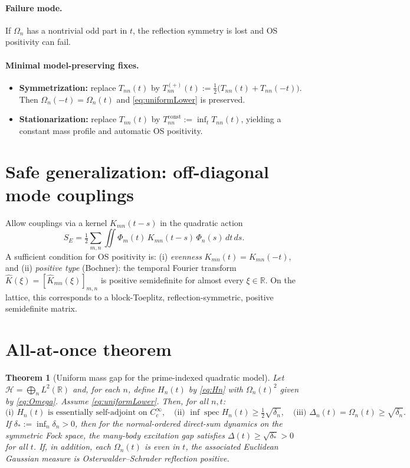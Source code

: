 \documentclass[11pt]{article}
\theoremstyle{plain}
\newtheorem{theorem}{Theorem}[section]
\theoremstyle{definition}
\theoremstyle{remark}
\newcommand{\R}{\mathbb{R}}
\newcommand{\Hcal}{\mathcal{H}}
\DeclareMathOperator{\spec}{spec}
\begin{document}
\paragraph{Failure mode.} If $\Omega_n$ has a nontrivial odd part in $t$, the reflection symmetry is lost and OS positivity can fail.

\paragraph{Minimal model-preserving fixes.}
\begin{itemize}[leftmargin=*]
  \item \textbf{Symmetrization:} replace $T_{nn}(t)$ by $T^{(+)}_{nn}(t):=\tfrac12\big(T_{nn}(t)+T_{nn}(-t)\big)$. Then $\Omega_n(-t)=\Omega_n(t)$ and \eqref{eq:uniformLower} is preserved.
  \item \textbf{Stationarization:} replace $T_{nn}(t)$ by $T^{\mathrm{const}}_{nn}:=\inf_t T_{nn}(t)$, yielding a constant mass profile and automatic OS positivity.
\end{itemize}

\section{Safe generalization: off-diagonal mode couplings}\label{sec:offdiag}
Allow couplings via a kernel $K_{mn}(t-s)$ in the quadratic action
\[
S_E=\tfrac12\sum_{m,n}\iint \Phi_m(t)\,K_{mn}(t-s)\,\Phi_n(s)\,dt\,ds.
\]
A sufficient condition for OS positivity is: (i) \emph{evenness} $K_{mn}(t)=K_{mn}(-t)$, and (ii) \emph{positive type} (Bochner): the temporal Fourier transform $\widehat K(\xi)=[\widehat K_{mn}(\xi)]_{m,n}$ is positive semidefinite for almost every $\xi\in\R$. On the lattice, this corresponds to a block-Toeplitz, reflection-symmetric, positive semidefinite matrix.

\section{All-at-once theorem}\label{sec:allatonce}
\begin{theorem}[Uniform mass gap for the prime-indexed quadratic model]\label{thm:main}
Let $\Hcal=\bigoplus_{n}L^2(\R)$ and, for each $n$, define $H_n(t)$ by \eqref{eq:Hn} with $\Omega_n(t)^2$ given by \eqref{eq:Omega}. Assume \eqref{eq:uniformLower}. Then, for all $n,t$:
\[
\text{(i) } H_n(t)\text{ is essentially self-adjoint on }C_c^\infty,\quad
\text{(ii) } \inf\spec H_n(t)\ge \tfrac12\sqrt{\delta_n},\quad
\text{(iii) } \Delta_n(t)=\Omega_n(t)\ge \sqrt{\delta_n}.
\]
If $\delta_*:=\inf_n\delta_n>0$, then for the normal-ordered direct-sum dynamics on the symmetric Fock space, the many-body excitation gap satisfies $\Delta(t)\ge\sqrt{\delta_*}>0$ for all $t$. If, in addition, each $\Omega_n(t)$ is even in $t$, the associated Euclidean Gaussian measure is Osterwalder--Schrader reflection positive.
\end{theorem}
\end{document}
